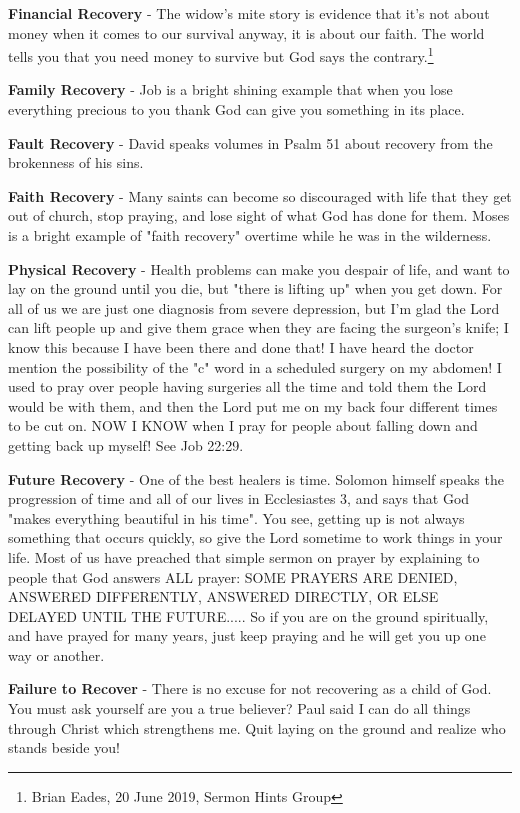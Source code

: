 \begin{compactenum}[I.][5]
    \item \textbf{Financial Recovery} - The widow's mite story is evidence that it's not about money when it comes to our survival anyway, it is about our faith.  The world tells you that you need money to survive but God says the contrary.\footnote{Brian Eades, 20 June 2019, Sermon Hints Group}
    \item \textbf{Family Recovery} - Job is a bright shining example that when you lose everything precious to you thank God can give you something in its place.
    \item \textbf{Fault Recovery} - David speaks volumes in Psalm 51 about recovery from the brokenness of his sins.
    \item \textbf{Faith Recovery} - Many saints can become so discouraged with life that they get out of church, stop praying,  and lose sight of what God has done for them. Moses is a bright example of "faith recovery" overtime while he was in the wilderness.
    \item \textbf{Physical Recovery} - Health problems can make you despair of life, and want to lay on the ground until you die, but "there is lifting up" when you get down.  For all of us we are just one diagnosis from severe depression, but I'm glad the Lord can lift people up  and give them grace when they are facing the surgeon's knife; I know this because I have been there and done that!  I have heard the doctor mention the possibility of the "c" word in a scheduled surgery on my abdomen!  I used to pray over people having surgeries all the time and told them the Lord would be with them, and then the Lord put me on my back four different times to be cut on.  NOW I KNOW when I pray for people about falling down and getting back up myself! See Job 22:29.
    \item \textbf{Future Recovery} - One of the best healers is time.  Solomon himself speaks the progression of time and all of our lives in Ecclesiastes 3, and says that God "makes everything beautiful in his time". You see, getting up is not always something that occurs quickly, so give the Lord sometime to work things in your life. Most of us have preached that simple sermon on prayer by explaining to people that God answers ALL prayer: SOME PRAYERS ARE DENIED, ANSWERED DIFFERENTLY, ANSWERED DIRECTLY, OR ELSE DELAYED UNTIL THE FUTURE..... So if you are on the ground spiritually, and have prayed for many years, just keep praying and he will get you up one way or another.
    \item \textbf{Failure to Recover} - There is no excuse for not recovering as a child of God. You must ask yourself are you a true believer? Paul said I can do all things through Christ which strengthens me. Quit laying on the ground and realize who stands beside you!
\end{compactenum}


